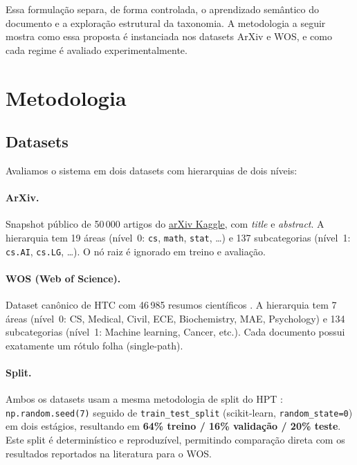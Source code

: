 \documentclass[11pt,a4paper,twoside]{article}
\begin{document}
Essa formulação separa, de forma controlada, o aprendizado semântico do
documento e a exploração estrutural da taxonomia. A metodologia a seguir mostra
como essa proposta é instanciada nos datasets ArXiv e WOS, e como cada regime é
avaliado experimentalmente.

\section{Metodologia}
\label{sec:method}

\subsection{Datasets}

Avaliamos o sistema em dois datasets com hierarquias de dois níveis:

\paragraph{ArXiv.}
Snapshot público de 50\,000 artigos do
\href{https://www.kaggle.com/datasets/Cornell-University/arxiv}{arXiv Kaggle},
com \textit{title} e \textit{abstract}. A hierarquia tem 19 áreas (nível~0:
\texttt{cs}, \texttt{math}, \texttt{stat}, \dots) e 137 subcategorias (nível~1:
\texttt{cs.AI}, \texttt{cs.LG}, \dots). O nó raiz é ignorado em treino e avaliação.

\paragraph{WOS (Web of Science).}
Dataset canônico de HTC com 46\,985 resumos científicos \cite{zhou2020hiagm}.
A hierarquia tem 7 áreas (nível~0: CS, Medical, Civil, ECE, Biochemistry, MAE,
Psychology) e 134 subcategorias (nível~1: Machine learning, Cancer, etc.).
Cada documento possui exatamente um rótulo folha (single-path).

\paragraph{Split.}
Ambos os datasets usam a mesma metodologia de split do HPT
\cite{wang2022hpt}: \texttt{np.random.seed(7)} seguido de
\texttt{train\_test\_split} (scikit-learn, \texttt{random\_state=0}) em dois
estágios, resultando em \textbf{64\% treino / 16\% validação / 20\% teste}.
Este split é determinístico e reproduzível, permitindo comparação direta com
os resultados reportados na literatura para o WOS.
\end{document}
